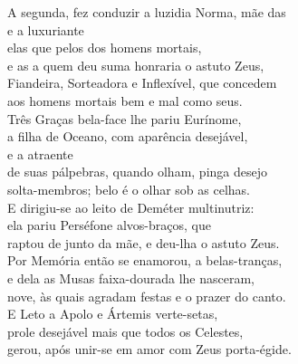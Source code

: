 \begin{pages}
\begin{Rightside}
\quad{}A segunda, fez conduzir a luzidia Norma, mãe das \\
  e a luxuriante \\
elas que 
pelos  dos homens mortais,\\
e as  a quem deu suma honraria o astuto Zeus,\\
Fiandeira, Sorteadora e Inflexível, que concedem \\
aos homens mortais bem e mal como seus.\\

\quad{}Três Graças bela-face lhe pariu Eurínome,\\
a filha de Oceano, com aparência desejável,\\
  e a atraente \\
de suas pálpebras, quando olham, pinga desejo \\
solta-membros; belo é o olhar sob as celhas.\\

\quad{}E dirigiu-se ao leito de Deméter multinutriz:\\
ela pariu Perséfone alvos-braços, que \\
raptou de junto da mãe, e deu-lha o astuto Zeus.\\

\quad{}Por Memória então se enamorou, a belas-tranças, \\
e dela as Musas faixa-dourada lhe nasceram,\\
nove, às quais agradam festas e o prazer do canto.\\

\quad{}E Leto a Apolo e Ártemis verte-setas,\\
prole desejável mais que todos os Celestes,\\
gerou, após unir-se em amor com Zeus porta-égide. \\


\end{Rightside}
\end{pages}
